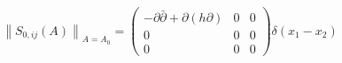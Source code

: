 \begin{equation}
\left\| S_{0,ij}(A)\right\| _{A=A_{0}}=\left( 
\begin{array}{ccc}
-\partial \bar{\partial}+\partial (h\partial ) & 0 & 0 \\ 
0 & 0 & 0 \\ 
0 & 0 & 0
\end{array}
\right) \delta (x_{1}-x_{2})  \label{hess}
\end{equation}

